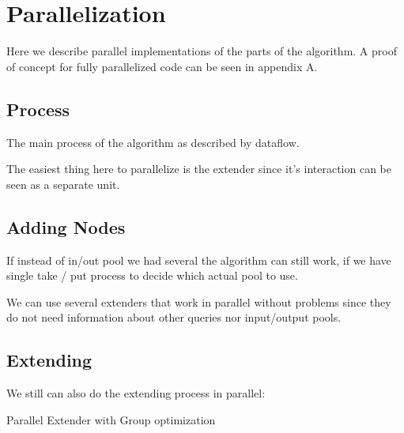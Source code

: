 \chapter{Parallelization}

Here we describe parallel implementations of the parts of the algorithm.
A proof of concept for fully parallelized code can be seen in appendix A.

\section{Process}

The main process of the algorithm as described by dataflow.\cite{Kahn74,Lee95}

\begin{figure}[H]
	
\end{figure}

The easiest thing here to parallelize is the extender since it's interaction
can be seen as a separate unit.

\section{Adding Nodes}

If instead of in/out pool we had several the algorithm can still work, if we
have single take / put process to decide which actual pool to use.

We can use several extenders that work in parallel without problems since 
they do not need information about other queries nor input/output pools.

\section{Extending}

We still can also do the extending process in parallel:

\begin{algorithm}[H]
	\caption{Parallel Extender with Group optimization}
\begin{algorithmic}[1]

\end{algorithmic}
\end{algorithm}

